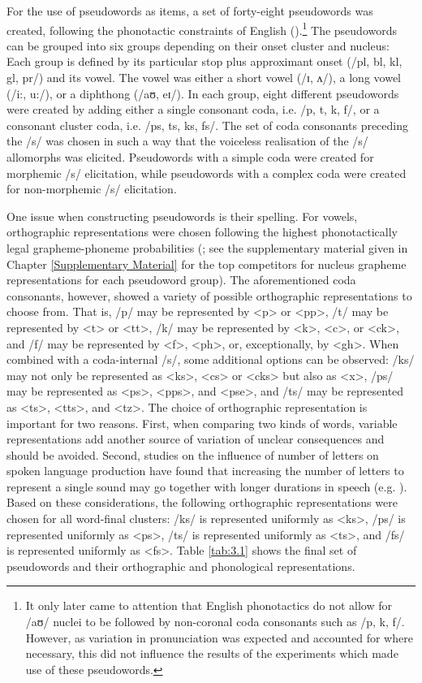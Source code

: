 For the use of pseudowords as items, a set of forty-eight pseudowords was created, following the phonotactic constraints of English (\cite{Gontijo2003}).\footnote{It only later came to attention that English phonotactics do not allow for /aʊ/ nuclei to be followed by non-coronal coda consonants such as /p, k, f/. However, as variation in pronunciation was expected and accounted for where necessary, this did not influence the results of the experiments which made use of these pseudowords.} The pseudowords can be grouped into six groups depending on their onset cluster and nucleus: Each group is defined by its particular stop plus approximant onset (/pl, bl, kl, gl, pr/) and its vowel. The vowel was either a short vowel (/ɪ, ʌ/), a long vowel (/i:, u:/), or a diphthong (/aʊ, eɪ/). In each group, eight different pseudowords were created by adding either a single consonant coda, i.e. /p, t, k, f/, or a consonant cluster coda, i.e. /ps, ts, ks, fs/. The set of coda consonants preceding the /s/ was chosen in such a way that the voiceless realisation of the /s/ allomorphs was elicited. Pseudowords with a simple coda were created for morphemic /s/ elicitation, while pseudowords with a complex coda were created for non-morphemic /s/ elicitation.

One issue when constructing pseudowords is their spelling. For vowels, orthographic representations were chosen following the highest phonotactically legal grapheme-phoneme probabilities (\cite{Gontijo2003}; see the supplementary material given in Chapter \ref{Supplementary Material} for the top competitors for nucleus grapheme representations for each pseudoword group). The aforementioned coda consonants, however, showed a variety of possible orthographic representations to choose from. That is, /p/ may be represented by <p> or <pp>, /t/ may be represented by <t> or <tt>, /k/ may be represented by <k>, <c>, or <ck>, and /f/ may be represented by <f>, <ph>, or, exceptionally, by <gh>. When combined with a coda-internal /s/, some additional options can be observed: /ks/ may not only be represented as <ks>, <cs> or <cks> but also as <x>, /ps/ may be represented as <ps>, <pps>, and <pse>, and /ts/ may be represented as <ts>, <tts>, and <tz>. The choice of orthographic representation is important for two reasons. First, when comparing two kinds of words, variable representations add another source of variation of unclear consequences and should be avoided. Second, studies on the influence of number of letters on spoken language production have found that increasing the number of letters to represent a single sound may go together with longer durations in speech (e.g. \cite{Brewer2008}). Based on these considerations, the following orthographic representations were chosen for all word-final clusters: /ks/ is represented uniformly as <ks>, /ps/ is represented uniformly as <ps>, /ts/ is represented uniformly as <ts>, and /fs/ is represented uniformly as <fs>. Table \ref{tab:3.1} shows the final set of pseudowords and their orthographic and phonological representations.

